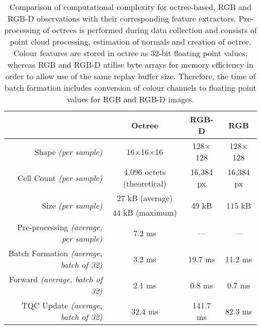 \begin{table}[ht]
    \centering
    \begin{tabular}{r|ccc}
                                                        &
        \textbf{Octree}                                 & \textbf{RGB-D}             & \textbf{RGB}                                     \\ \hline
        Shape \textit{(per sample)}                     & 16\(\times\)16\(\times\)16 & 128\(\times\)128       & 128\(\times\)128        \\
        Cell Count \textit{(per sample)}                & 4,096 octets (theoretical) & 16,384 px              & 16,384 px               \\
        \multirow{2}{*}{Size \textit{(per sample)}}     & 27 kB (average)            & \multirow{2}{*}{49 kB} & \multirow{2}{*}{115 kB} \\
                                                        & 44 kB (maximum)            &                        &                         \\ \hline
        Pre-processing \textit{(average, per sample)}   & 7.2 ms                     & ---                    & ---                     \\
        Batch Formation \textit{(average, batch of 32)} & 3.2 ms                     & 19.7 ms                & 11.2 ms                 \\
        Forward \textit{(average, batch of 32)}         & 2.1 ms                     & 0.8 ms                 & 0.7 ms                  \\
        TQC Update \textit{(average, batch of 32)}      & 32.4 ms                    & 141.7 ms               & 82.3 ms
    \end{tabular}
    \caption{Comparison of computational complexity for octree-based, RGB and RGB-D observations with their corresponding feature extractors. Pre-processing of octrees is performed during data collection and consists of point cloud processing, estimation of normals and creation of octree. Colour features are stored in octree as 32-bit floating point values, whereas RGB and RGB-D utilise byte arrays for memory efficiency in order to allow use of the same replay buffer size. Therefore, the time of batch formation includes conversion of colour channels to floating point values for RGB and RGB-D images.}
    \label{tab:feature_extractor_memory_and_computational_time}
\end{table}

\newpage

